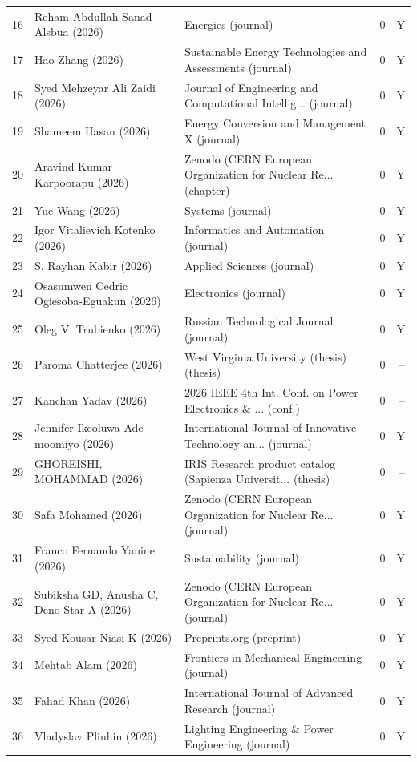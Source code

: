 \begin{longtable}{@{}r p{5.9cm} p{4.4cm} r r@{}}
16 & Reham Abdullah Sanad Alsbua (2026) & Energies (journal) & 0 & Y \\
17 & Hao Zhang (2026) & Sustainable Energy Technologies and Assessments (journal) & 0 & Y \\
18 & Syed Mehzeyar Ali Zaidi (2026) & Journal of Engineering and Computational Intellig... (journal) & 0 & Y \\
19 & Shameem Hasan (2026) & Energy Conversion and Management X (journal) & 0 & Y \\
20 & Aravind Kumar Karpoorapu (2026) & Zenodo (CERN European Organization for Nuclear Re... (chapter) & 0 & Y \\
21 & Yue Wang (2026) & Systems (journal) & 0 & Y \\
22 & Igor Vitalievich Kotenko (2026) & Informatics and Automation (journal) & 0 & Y \\
23 & S. Rayhan Kabir (2026) & Applied Sciences (journal) & 0 & Y \\
24 & Osasumwen Cedric Ogiesoba-Eguakun (2026) & Electronics (journal) & 0 & Y \\
25 & Oleg V. Trubienko (2026) & Russian Technological Journal (journal) & 0 & Y \\
26 & Paroma Chatterjee (2026) & West Virginia University (thesis) (thesis) & 0 & -- \\
27 & Kanchan Yadav (2026) & 2026 IEEE 4th Int. Conf. on Power Electronics \& ... (conf.) & 0 & -- \\
28 & Jennifer Ikeoluwa Ade-moomiyo (2026) & International Journal of Innovative Technology an... (journal) & 0 & Y \\
29 & GHOREISHI, MOHAMMAD (2026) & IRIS Research product catalog (Sapienza Universit... (thesis) & 0 & -- \\
30 & Safa Mohamed (2026) & Zenodo (CERN European Organization for Nuclear Re... (journal) & 0 & Y \\
31 & Franco Fernando Yanine (2026) & Sustainability (journal) & 0 & Y \\
32 & Subiksha GD, Anusha C, Deno Star A (2026) & Zenodo (CERN European Organization for Nuclear Re... (journal) & 0 & Y \\
33 & Syed Kousar Niasi K (2026) & Preprints.org (preprint) & 0 & Y \\
34 & Mehtab Alam (2026) & Frontiers in Mechanical Engineering (journal) & 0 & Y \\
35 & Fahad Khan (2026) & International Journal of Advanced Research (journal) & 0 & Y \\
36 & Vladyslav Pliuhin (2026) & Lighting Engineering \& Power Engineering (journal) & 0 & Y \\

\end{longtable}
